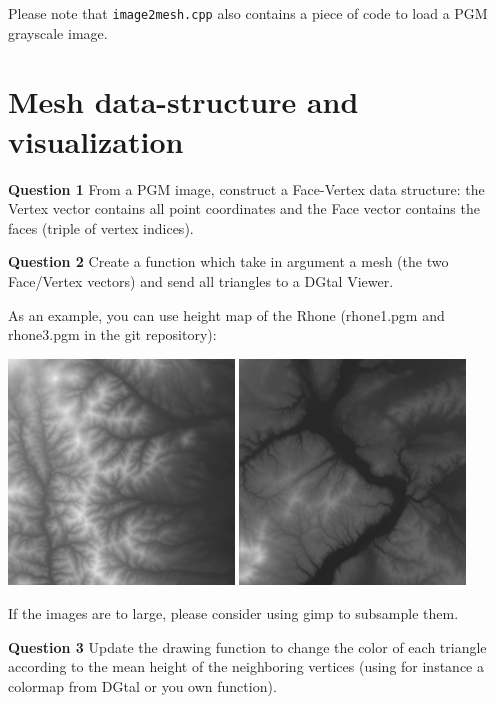 \documentclass[a4paper, 11pt]{article}
\begin{document}
Please note that \texttt{image2mesh.cpp} also contains a piece of code
to load a  PGM grayscale image.


\section{Mesh data-structure and visualization}

{\bf Question 1}  From a PGM image, construct a Face-Vertex data
structure: the Vertex vector contains all point coordinates and the
Face vector contains the faces (triple of vertex indices).


{\bf Question 2} Create a function which take in argument a mesh (the
two Face/Vertex  vectors) and send all triangles to a DGtal Viewer.

As an example, you can use height map of the Rhone (rhone1.pgm and
rhone3.pgm in the git repository):
 \begin{center}
    \includegraphics[width=6cm]{rhone1}
    \includegraphics[width=6cm]{rhone3}
  \end{center}
If the images are to large, please consider using gimp to subsample them.
 


{\bf Question 3} Update the drawing function to change the color of
each triangle according to the mean height of the neighboring vertices
(using for instance a colormap from DGtal or you own function).
\end{document}
